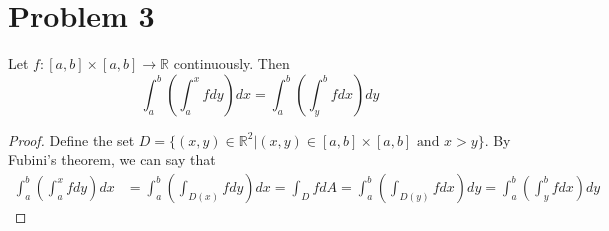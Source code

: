 \documentclass{article}
\theoremstyle{definition}
\begin{document}
\section*{Problem 3}
\begin{mdframed}[]
    Let $f:[a,b]\times[a,b] \rightarrow \mathbb{R}$ continuously. Then 
    \[
        \int_a^b\left(\int_a^xfdy\right)dx = \int_a^b\left(\int_y^bfdx\right)dy
    \]
\end{mdframed}
\begin{proof}
    Define the set $D = \{(x,y) \in \mathbb{R}^2 | (x,y) \in [a,b]\times[a,b] \text{ and } x > y\}$. By Fubini's theorem, we can say that
    \begin{align*}
        \int_a^b\left(\int_a^xfdy\right)dx &= \int_a^b\left(\int_{D(x)}fdy\right)dx
        =\int_DfdA
        =\int_a^b\left(\int_{D(y)}fdx\right)dy
        = \int_a^b\left(\int_y^bfdx\right)dy
    \end{align*}
\end{proof}
\end{document}
